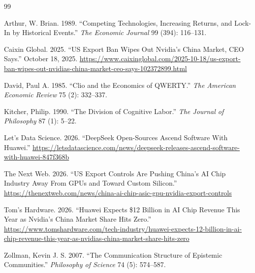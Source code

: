 \documentclass[12pt]{article}
\begin{document}
\begin{thebibliography}{99}

Arthur, W. Brian. 1989. ``Competing Technologies, Increasing Returns, and Lock-In by Historical Events.'' \textit{The Economic Journal} 99 (394): 116--131.

Caixin Global. 2025. ``US Export Ban Wipes Out Nvidia's China Market, CEO Says.'' October 18, 2025. \url{https://www.caixinglobal.com/2025-10-18/us-export-ban-wipes-out-nvidias-china-market-ceo-says-102372899.html}

David, Paul A. 1985. ``Clio and the Economics of QWERTY.'' \textit{The American Economic Review} 75 (2): 332--337.

Kitcher, Philip. 1990. ``The Division of Cognitive Labor.'' \textit{The Journal of Philosophy} 87 (1): 5--22.

Let's Data Science. 2026. ``DeepSeek Open-Sources Ascend Software With Huawei.'' \url{https://letsdatascience.com/news/deepseek-releases-ascend-software-with-huawei-847f368b}

The Next Web. 2026. ``US Export Controls Are Pushing China's AI Chip Industry Away From GPUs and Toward Custom Silicon.'' \url{https://thenextweb.com/news/china-ai-chip-asic-gpu-nvidia-export-controls}

Tom's Hardware. 2026. ``Huawei Expects \$12 Billion in AI Chip Revenue This Year as Nvidia's China Market Share Hits Zero.'' \url{https://www.tomshardware.com/tech-industry/huawei-expects-12-billion-in-ai-chip-revenue-this-year-as-nvidias-china-market-share-hits-zero}

Zollman, Kevin J. S. 2007. ``The Communication Structure of Epistemic Communities.'' \textit{Philosophy of Science} 74 (5): 574--587.

\end{thebibliography}
\end{document}

